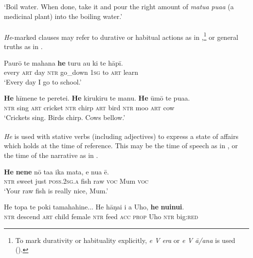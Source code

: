 \glt 
‘Boil water. When done, take it and pour the right amount of \textit{matu{\ꞌ}a pua{\ꞌ}a} (a medicinal plant) into the boiling water.’ \textstyleExampleref{[R313.160–161]}
\z

\paragraph{}\label{sec:7.2.3.2.2} \textit{He}{}-marked clauses may refer to durative or habitual actions as in ,\footnote{\label{fn:317}To mark durativity or habituality explicitly, \textit{e V era} or \textit{e V {\ꞌ}ā/{\ꞌ}ana} is used ().} or general truths as in .

\ea\label{ex:7.6}
\gll Paurō te mahana \textbf{he} turu au ki te hāpī. \\
every \textsc{art} day \textsc{ntr} go\_down \textsc{1sg} to \textsc{art} learn \\

\glt 
‘Every day I go to school.’ \textstyleExampleref{[R151.059]} 
\z

\ea\label{ex:7.7}
\gll \textbf{He} hīmene te perete{\ꞌ}i. \textbf{He} kirukiru te manu. \textbf{He} {\ꞌ}ūmō te pua{\ꞌ}a. \\
\textsc{ntr} sing \textsc{art} cricket \textsc{ntr} chirp \textsc{art} bird \textsc{ntr} moo \textsc{art} cow \\

\glt
‘Crickets sing. Birds chirp. Cows bellow.’ \textstyleExampleref{[Notes]}
\z

\paragraph{}\label{sec:7.2.3.2.3} \textit{He} is used with stative verbs (including adjectives) to express a state of affairs which holds at the time of reference. This may be the time of speech as in , or the time of the narrative as in .

\ea\label{ex:7.8}
\gll \textbf{He} \textbf{nene} nō ta{\ꞌ}a ika mata, e nua ē. \\
\textsc{ntr} sweet just \textsc{poss.2sg.a} fish raw \textsc{voc} Mum \textsc{voc} \\

\glt 
‘Your raw fish is really nice, Mum.’ \textstyleExampleref{[R535.095]} 
\z

\ea\label{ex:7.9}
\gll He topa te poki tamahahine... He hāŋai i a Uho, \textbf{he} \textbf{nuinui}. \\
\textsc{ntr} descend \textsc{art} child female \textsc{ntr} feed \textsc{acc} \textsc{prop} Uho \textsc{ntr} big:\textsc{red} \\

